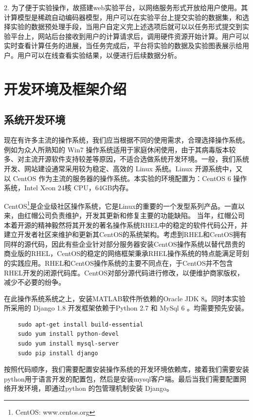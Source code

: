 \documentclass[oneside]{ZJUthesis}
\begin{document}
2. 为了便于实验操作，故搭建web实验平台，以网络服务形式开放给用户使用。其计算模型是稀疏自动编码器模型，用户可以在实验平台上提交实验的数据集，和选择实验的数据预处理手段，当用户自定义完上述选项后就可以以任务形式提交到实验平台上，网站后台接收到用户的计算请求后，调用硬件资源开始计算。用户可以实时查看计算任务的进展，当任务完成后，平台将实验的数据及实验图表展示给用户。用户可以在线查看实验结果，以便进行后续数据分析。


\chapter{开发环境及框架介绍}
\section{系统开发环境}
现在有许多主流的操作系统，我们应当根据不同的使用需求，合理选择操作系统。例如为众人所熟知的 Win7 操作系统适用于家庭休闲使用，由于其病毒版本较多、对主流开源软件支持较差等原因，不适合选做系统开发环境。一般，我们系统开发、网站建设通常采用较为稳定、高效的 Linux 系统。Linux 开源系统中，又以 CentOS 作为主流的服务器的操作系统。本实验的环境配置为：CentOS 6 操作系统，Intel Xeon 24核 CPU，64GB内存。

CentOS\footnote{CentOS: www.centos.org}是企业级社区操作系统，它是Linux的重要的一个发型系列产品。一直以来，由红帽公司负责维护，开发其更新和修复主要的功能缺陷。 当年，红帽公司本着开源的精神毅然将其开发的著名操作系统RHEL中的稳定的软件代码公开，并建立开发者社区来维护和更新其CentOS的系统架构。考虑到RHEL和CentOS拥有同样的源代码，因此有些企业针对部分服务器安装CentOS操作系统以替代昂贵的商业版的RHEL，CentOS的稳定的网络框架秉承RHEL操作系统的特点能满足苛刻的实践应用。RHEL和CentOS操作系统的主要不同点在，于CentOS并不包含RHEL开发的闭源代码库。CentOS对部分源代码进行修改，以便维护商家版权，减少不必要的纷争。

在此操作系统系统之上，安装MATLAB软件所依赖的Oracle JDK 8。同时本实验所采用的 Django 1.8 开发框架依赖于Python 2.7 和 MySql 6 。均需要预先安装。
\begin{verbatim}
    sudo apt-get install build-essential  
    sudo yum install python-devel         
    sudo yum install mysql-server         
    sudo pip install django               
\end{verbatim}
按照代码顺序，我们需要配置安装操作系统的开发环境依赖库，接着我们需要安装python用于语言开发的配置包，然后是安装mysql客户端。最后当我们需要配置网络开发环境，即通过python 的包管理机制安装 Django。
\end{document}
